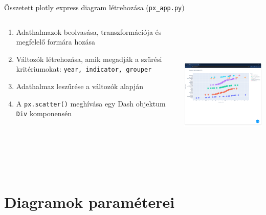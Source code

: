 \documentclass[english, aspectratio=169]{beamer}
\makeatletter
\let\origtableofcontents=\tableofcontents
\def\tableofcontents{\@ifnextchar[{\origtableofcontents}{\gobbletableofcontents}}
\def\gobbletableofcontents#1{\origtableofcontents}
\makeatother
\begin{document}
	\begin{frame}{Összetett plotly express diagram létrehozása (\texttt{px\_app.py})}
		\begin{columns}
			\begin{column}{.5\textwidth}
				\begin{enumerate}
					\item Adathalmazok beolvasása, transzformációja és megfelelő formára hozása
					\item Változók létrehozása, amik megadják a szűrési kritériumokat: \texttt{year, indicator, grouper}
					\item Adathalmaz leszűrése a változók alapján
					\item A \texttt{px.scatter()} meghívása egy Dash objektum \texttt{Div} komponensén
				\end{enumerate}
			\end{column}
			\begin{column}{.5\textwidth}
				\begin{center}
					\includegraphics[width=7cm, height=7cm, keepaspectratio]{images/plots_13.png}
				\end{center}
			\end{column} 
		\end{columns}
	\end{frame}
	
	\section{Diagramok paraméterei}
	
	\begin{frame}{}
		\tableofcontents[currentsection]
	\end{frame}
	
\end{document}
